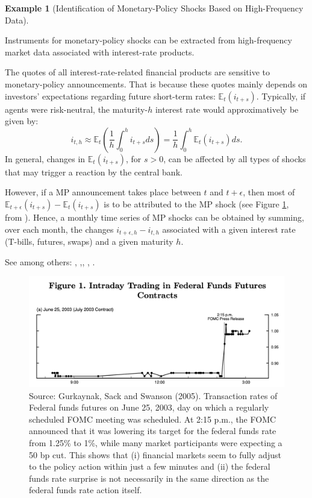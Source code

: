 \documentclass[
  12pt,
]{book}
\theoremstyle{definition}
\theoremstyle{definition}
\newtheorem{example}{Example}[chapter]
\theoremstyle{definition}
\theoremstyle{definition}
\theoremstyle{remark}
\begin{document}
\begin{example}[Identification of Monetary-Policy Shocks Based on High-Frequency Data]
\protect\hypertarget{exm:HighFreq}{}\label{exm:HighFreq}

Instruments for monetary-policy shocks can be extracted from high-frequency market data associated with interest-rate products.

The quotes of all interest-rate-related financial products are sensitive to monetary-policy announcements. That is because these quotes mainly depends on investors' expectations regarding future short-term rates: \(\mathbb{E}_t(i_{t+s})\). Typically, if agents were risk-neutral, the maturity-\(h\) interest rate would approximatively be given by:
\[
i_{t,h} \approx \mathbb{E}_t\left(\frac{1}{h}\int_{0}^{h} i_{t+s} ds\right) = \frac{1}{h}\int_{0}^{h} \mathbb{E}_t\left(i_{t+s}\right) ds.
\]
In general, changes in \(\mathbb{E}_t(i_{t+s})\), for \(s>0\), can be affected by all types of shocks that may trigger a reaction by the central bank.

However, if a MP announcement takes place between \(t\) and \(t+\epsilon\), then most of \(\mathbb{E}_{t+\epsilon}(i_{t+s})-\mathbb{E}_t(i_{t+s})\) is to be attributed to the MP shock (see Figure \ref{fig:HighFreq}, from \citet{Gurkaynak_et_al_2005}). Hence, a monthly time series of MP shocks can be obtained by summing, over each month, the changes \(i_{t+ \epsilon,h} - i_{t,h}\) associated with a given interest rate (T-bills, futures, swaps) and a given maturity \(h\).

See among others: \citet{KUTTNER2001523}, \citet{Cochrane_Piazzesi_2002},\citet{Gurkaynak_et_al_2005}, \citet{Piazzesi_Swanson_2008}, \citet{Gertler_Karadi_2015}.

\begin{figure}
\includegraphics[width=0.95\linewidth]{images/GSS2005_HFI} \caption{Source: Gurkaynak, Sack and Swanson (2005). Transaction rates of Federal funds futures on June 25, 2003, day on which a regularly scheduled FOMC meeting was scheduled. At 2:15 p.m., the FOMC announced that it was lowering its target for the federal funds rate from 1.25\% to 1\%, while many market participants were expecting a 50 bp cut. This shows that (i) financial markets seem to fully adjust to the policy action within just a few minutes and (ii) the federal funds rate surprise is not necessarily in the same direction as the federal funds rate action itself.}\label{fig:HighFreq}
\end{figure}

\end{example}
\end{document}
